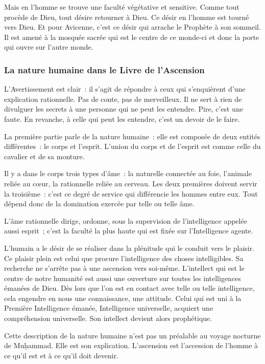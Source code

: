 Mais en l'homme se trouve une faculté végétative et sensitive. Comme
tout procède de Dieu, tout désire retourner à Dieu. Ce désir en l'homme
est tourné vers Dieu. Et pour Avicenne, c'est ce désir qui arrache le
Prophète à son sommeil. Il est amené à la mosquée sacrée qui est le
centre de ce monde-ci et donc la porte qui ouvre sur l'autre monde.


\subsubsection{La nature humaine dans le Livre
de l'Ascension}

L'Avertissement est clair~: il s'agit de répondre à ceux qui
s'enquièrent d'une explication rationnelle. Pas de conte, pas de
merveilleux. Il ne sert à rien de divulguer les secrets à une personne
qui ne peut les entendre. Pire, c'est une faute. En revanche, à celle
qui peut les entendre, c'est un devoir de le faire.

La première partie parle de la nature humaine~: elle est composée de
deux entités différentes~: le corps et l'esprit. L'union du corps et de
l'esprit est comme celle du cavalier et de sa monture.

Il y a dans le corps trois types d'âme~: la naturelle connectée au foie,
l'animale reliée au cœur, la rationnelle reliée au cerveau. Les deux
premières doivent servir la troisième~: c'est ce degré de service qui
différencie les hommes entre eux. Tout dépend donc de la domination
exercée par telle ou telle âme.

L'âme rationnelle dirige, ordonne, sous la supervision de l'intelligence
appelée aussi esprit~; c'est la faculté la plus haute qui est fixée sur
l'Intelligence agente.

L'humain a le désir de se réaliser dans la plénitude qui le conduit vers
le plaisir. Ce plaisir plein est celui que procure l'intelligence des
choses intelligibles. Sa recherche ne s'arrête pas à une ascension vers
soi-même. L'intellect qui est le centre de notre humanité est aussi une
ouverture sur toutes les intelligences émanées de Dieu. Dès lors que
l'on est en contact avec telle ou telle intelligence, cela engendre en
nous une connaissance, une attitude. Celui qui est uni à la Première
Intelligence émanée, Intelligence universelle, acquiert une
compréhension universelle. Son intellect devient alors prophétique.

Cette description de la nature humaine n'est pas un préalable au voyage
nocturne de Muḥammad. Elle est son explication. L'ascension est
l'accession de l'homme à ce qu'il est et à ce qu'il doit devenir.




